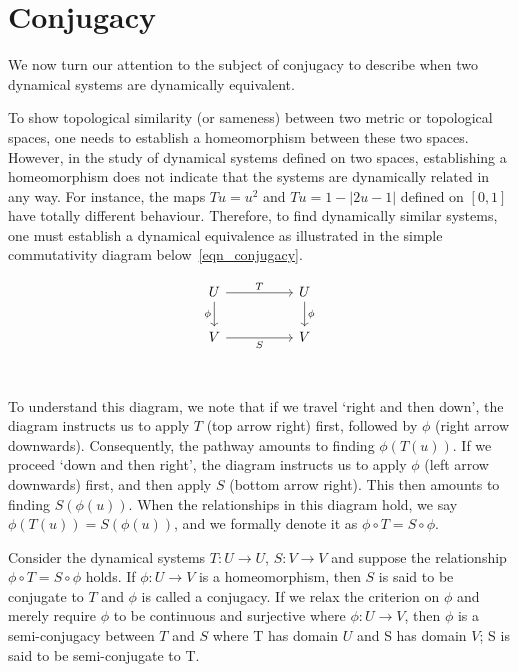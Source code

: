 \section{Conjugacy}

We now turn our attention to the subject of conjugacy to describe when two dynamical systems are dynamically equivalent. 

To show topological similarity (or sameness) between two metric or topological spaces, one needs to establish a homeomorphism between these two spaces. 
However, in the study of dynamical systems defined on two spaces, establishing a homeomorphism does not indicate that the systems are dynamically related in any way.
For instance, the maps $Tu=u^2$ and $Tu=1-|2u-1|$ defined on $[0,1]$ have totally different behaviour. 
Therefore, to find dynamically similar systems, one must establish a dynamical equivalence as illustrated in the simple commutativity diagram below~\ref{eqn_conjugacy}.

\begin{equation}\label{eqn_conjugacy}
  \begin{tikzcd}
    U && U \\
    V && V \\
    \arrow["T", from=1-1, to=1-3]
    \arrow["\phi", from=1-3, to=2-3]
    \arrow["\phi"', from=1-1, to=2-1]
    \arrow["S"', from=2-1, to=2-3]
  \end{tikzcd}
  \end{equation}

To understand this diagram, we note that if we travel `right and then down', the diagram instructs us to apply $T$ (top arrow right) first, followed by $\phi$ (right arrow downwards). Consequently, the pathway amounts to finding $\phi(T(u))$. If we proceed `down and then right', the diagram instructs us to apply $\phi$ (left arrow downwards) first, and then apply $S$ (bottom arrow right). This then amounts to finding  $S(\phi(u))$. When the relationships in this diagram hold, we say $\phi(T(u))= S(\phi(u))$, and we formally denote it as $\phi \circ T=S\circ \phi$.

\begin{Definition}
  \label{Dfn_Conjugate}\rm
  Consider the dynamical systems $T:U\to{U}$, $S:V\to{V}$ and suppose the relationship $\phi \circ T=S\circ \phi$ holds. If $\phi:U\to{V}$ is a homeomorphism, then $S$ is said to be conjugate to $T$ and $\phi$ is called a conjugacy. If we relax the criterion on $\phi$ and merely require $\phi$ to be continuous and surjective where $\phi:U\to{V}$, then $\phi$ is a semi-conjugacy between $T$ and $S$ where T has domain $U$ and S has domain $V$; S is said to be semi-conjugate to T. 
\end{Definition} 


